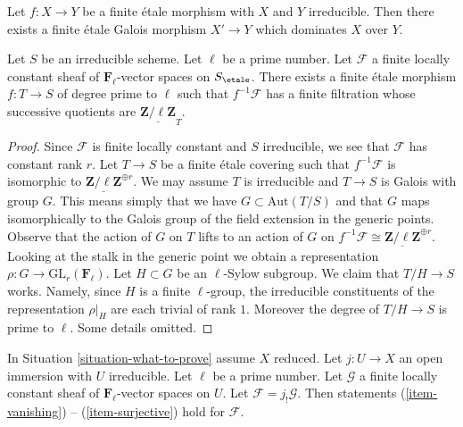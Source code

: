 \begin{exercise}
\label{exercise-finite-etale-under-galois}
Let $f: X \to Y$ be a finite \'etale morphism with $X$ and $Y$
irreducible. Then there exists a finite \'etale Galois
morphism $X' \to Y$ which dominates $X$ over $Y$.
\end{exercise}

\begin{lemma}
\label{lemma-pullback-filtered}
Let $S$ be an irreducible scheme. Let $\ell$ be a prime number. Let
$\mathcal{F}$ a finite locally constant sheaf of $\mathbf{F}_\ell$-vector
spaces on $S_\etale$. There exists a finite \'etale morphism
$f : T \to S$ of degree prime to $\ell$ such that $f^{-1}\mathcal{F}$
has a finite filtration whose successive quotients are
$\underline{\mathbf{Z}/\ell\mathbf{Z}}_T$.
\end{lemma}

\begin{proof}
Since $\mathcal{F}$ is finite locally constant and $S$ irreducible, we
see that $\mathcal{F}$ has constant rank $r$. Let $T \to S$ be a finite
\'etale covering such that $f^{-1}\mathcal{F}$ is isomorphic to
$\underline{\mathbf{Z}/\ell \mathbf{Z}}^{\oplus r}$.
We may assume $T$ is irreducible and $T \to S$ is Galois with group $G$.
This means simply that we have $G \subset \text{Aut}(T/S)$ and that
$G$ maps isomorphically to the Galois group of the field extension
in the generic points. Observe that the action of $G$ on $T$ lifts to
an action of $G$ on
$f^{-1}\mathcal{F} \cong \underline{\mathbf{Z}/\ell \mathbf{Z}}^{\oplus r}$.
Looking at the stalk in the generic point we obtain a representation
$\rho : G \to \text{GL}_r(\mathbf{F}_\ell)$. Let $H \subset G$ be an
$\ell$-Sylow subgroup. We claim that $T/H \to S$ works. Namely, since
$H$ is a finite $\ell$-group, the irreducible constituents of the
representation $\rho|_H$ are each trivial of rank $1$. Moreover the
degree of $T/H \to S$ is prime to $\ell$. Some details omitted.
\end{proof}

\begin{lemma}
\label{lemma-vanishing-easier}
In Situation \ref{situation-what-to-prove} assume $X$ reduced.
Let $j : U \to X$ an open immersion with $U$ irreducible. Let
$\ell$ be a prime number. Let $\mathcal{G}$ a finite locally
constant sheaf of $\mathbf{F}_\ell$-vector spaces on $U$. Let
$\mathcal{F} = j_!\mathcal{G}$. Then statements
(\ref{item-vanishing}) -- (\ref{item-surjective}) hold for $\mathcal{F}$.
\end{lemma}

